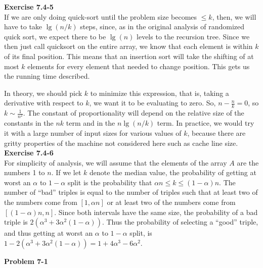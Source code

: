 \documentclass{article}
\begin{document}
\noindent\textbf{Exercise 7.4-5}\\

If we are only doing quick-sort until the problem size becomes $\le k$, then, we will have to take $\lg(n/k)$ steps, since, as in the original analysis of randomized quick sort, we expect there to be $\lg(n)$ levels to the recursion tree. Since we then just call quicksort on the entire array, we know that each element is within $k$ of its final position. This means that an insertion sort will take the shifting of at most $k$ elements for every element that needed to change position. This gets us the running time described.

In theory, we should pick $k$ to minimize this expression, that is, taking a derivative with respect to $k$, we want it to be evaluating to zero. So, $n - \frac{n}{k} =0$, so $k \sim \frac{1}{n^2} $. The constant of proportionality will depend on the relative size of the constants in the $nk$ term and in the $n\lg(n/k)$ term. In practice, we would try it with a large number of input sizes for various values of $k$, because there are gritty properties of the machine not considered here such as cache line size.
\\

\noindent\textbf{Exercise 7.4-6}\\

For simplicity of analysis, we will assume that the elements of the array $A$ are the numbers 1 to $n$.  If we let $k$ denote the median value, the probability of getting at worst an $\alpha$ to $1-\alpha$ split is the probability that $\alpha n \leq k \leq (1-\alpha)n$.  The number of ``bad'' triples is equal to the number of triples such that at least two of the numbers come from $[1,\alpha n]$ or at least two of the numbers come from $[(1-\alpha)n, n]$.  Since both intervals have the same size, the probability of a bad triple is $2(\alpha^3 +3\alpha^2(1-\alpha))$.  Thus the probability of selecting a ``good'' triple, and thus getting at worst an $\alpha$ to $1-\alpha$ split, is $1 - 2(\alpha^3 +3\alpha^2(1-\alpha)) = 1 + 4\alpha^3 - 6\alpha^2$.

\noindent\textbf{Problem 7-1}\\
\end{document}
